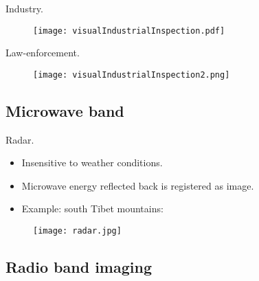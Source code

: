 
\begin{frame}
Industry.
\begin{figure}
\texttt{[image: visualIndustrialInspection.pdf]}
\end{figure}
\end{frame}


\begin{frame}
Law-enforcement.
\begin{figure}
\texttt{[image: visualIndustrialInspection2.png]}
\end{figure}
\end{frame}


\subsection{Microwave band}


\begin{frame}
Radar.
\begin{itemize}
\item Insensitive to weather conditions.
\item Microwave energy reflected back is registered as image.
\item Example: south Tibet mountains:
\end{itemize}
\begin{figure}
\texttt{[image: radar.jpg]}
\end{figure}
\end{frame}


\subsection{Radio band imaging}


